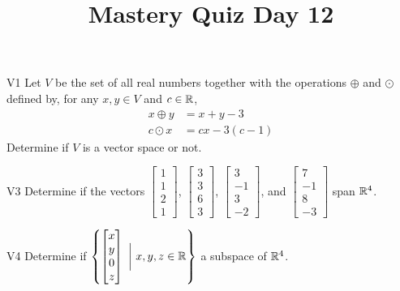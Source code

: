 \documentclass{sbgLAquiz}
\title{Mastery Quiz Day 12 }
\begin{document}
\begin{problem}{V1}
Let $V$ be the  set of all real numbers together with the operations $\oplus$ and $\odot$ defined by, for any $x,y \in V$ and $c \in \mathbb{R}$,
\begin{align*}
x\oplus y  &= x+y-3 \\
c \odot x &= cx-3(c-1)
\end{align*}
Determine if $V$ is a vector space or not.
\end{problem}

\begin{problem}{V3}
Determine if the vectors $\begin{bmatrix} 1 \\ 1 \\ 2 \\1 \end{bmatrix}$, $\begin{bmatrix} 3 \\ 3 \\ 6 \\ 3 \end{bmatrix}$, $\begin{bmatrix}3 \\ -1 \\ 3 \\ -2\end{bmatrix}$, and $\begin{bmatrix} 7 \\ -1 \\ 8 \\ -3 \end{bmatrix}$  span $\mathbb{R}^4$.
\end{problem}
\newpage

\begin{problem}{V4}
Determine if $\left\{ \begin{bmatrix} x \\ y \\ 0 \\ z \end{bmatrix}\  \bigg|\ x,y,z \in \mathbb{R}\right\}$  a subspace of $\mathbb{R}^4$.
\end{problem}
\end{document}

